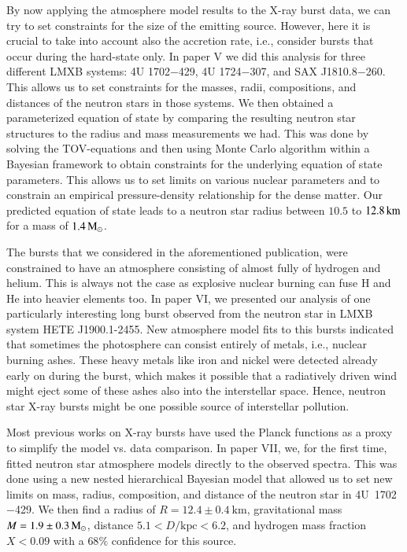By now applying the atmosphere model results to the X-ray burst data, we can try to set constraints for the size of the emitting source.
However, here it is crucial to take into account also the accretion rate, i.e., consider bursts that occur during the hard-state only.
In paper V we did this analysis for three different LMXB systems: 4U 1702$-$429, 4U 1724$-$307, and SAX J1810.8$-$260. 
This allows us to set constraints for the masses, radii, compositions, and distances of the neutron stars in those systems.
We then obtained a parameterized equation of state by comparing the resulting neutron star structures to the radius and mass measurements we had.
This was done by solving the TOV-equations and then using Monte Carlo algorithm within a Bayesian framework to obtain constraints for the underlying equation of state parameters.
This allows us to set limits on various nuclear parameters and to constrain an empirical pressure-density relationship for the dense matter. 
Our predicted equation of state leads to a neutron star radius between $10.5$ to $12.8\, \mathrm{km}$ for a mass of $1.4\, \mathrm{M}_{\odot}$.  


The bursts that we considered in the aforementioned publication, were constrained to have an atmosphere consisting of almost fully of hydrogen and helium.
This is always not the case as explosive nuclear burning can fuse H and He into heavier elements too.
In paper VI, we presented our analysis of one particularly interesting long burst observed from the neutron star in LMXB system HETE J1900.1-2455. 
New atmosphere model fits to this bursts indicated that sometimes the photosphere can consist entirely of metals, i.e., nuclear burning ashes.
These heavy metals like iron and nickel were detected already early on during the burst, which makes it possible that a radiatively driven wind might eject some of these ashes also into the interstellar space.
Hence, neutron star X-ray bursts might be one possible source of interstellar pollution.

Most previous works on X-ray bursts have used the Planck functions as a proxy to simplify the model vs. data comparison.
In paper VII, we, for the first time, fitted neutron star atmosphere models directly to the observed spectra.
This was done using a new nested hierarchical Bayesian model that allowed us to set new limits on mass, radius, composition, and distance of the neutron star in 4U~1702$-$429. 
We then find a radius of $R = 12.4\pm 0.4~\mathrm{km}$, gravitational mass $M=1.9\pm 0.3\, \mathrm{M}_{\odot}$, distance $5.1 < D/\mathrm{kpc} < 6.2$, and hydrogen mass fraction $X < 0.09$ with a $68\%$ confidence for this source.




